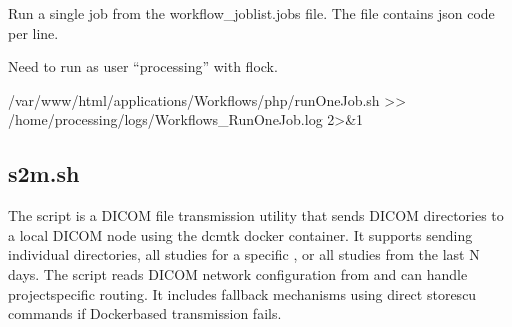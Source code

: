 \documentclass[letterpaper,10pt,english]{sphinxmanual}
\begin{document}
\sphinxAtStartPar
Run a single job from the workflow\_joblist.jobs file. The file contains json code per line.

\sphinxAtStartPar
Need to run as user “processing” with flock.
\begin{description}
\begin{description}
\sphinxAtStartPar
/var/www/html/applications/Workflows/php/runOneJob.sh \textgreater{}\textgreater{} /home/processing/logs/Workflows\_RunOneJob.log 2\textgreater{}\&1

\end{description}

\end{description}

\sphinxstepscope


\subsection{s2m.sh}
\label{\detokenize{Architecture/scripts/s2m:s2m-sh}}\label{\detokenize{Architecture/scripts/s2m::doc}}
\sphinxAtStartPar
The  script is a DICOM file transmission utility that sends DICOM directories to a local DICOM node using the dcmtk docker container. It supports sending individual directories, all studies for a specific , or all studies from the last N days. The script reads DICOM network configuration from  and can handle project\sphinxhyphen{}specific routing. It includes fallback mechanisms using direct storescu commands if Docker\sphinxhyphen{}based transmission fails.

\sphinxAtStartPar
{}


\sphinxAtStartPar
{}

\end{document}
